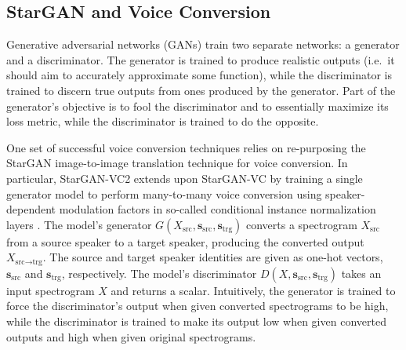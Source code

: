 \subsection{StarGAN and Voice Conversion}
\label{sec:stargan}

Generative adversarial networks (GANs) train two separate networks: a generator and a discriminator.
The generator is trained to produce realistic outputs (i.e.\ it should aim to accurately approximate some function), while the discriminator is trained to discern true outputs from ones produced by the generator.
Part of the generator's objective is to fool the discriminator and to essentially maximize its loss metric, while the discriminator is trained to do the opposite.

One set of successful voice conversion techniques relies on re-purposing the StarGAN image-to-image translation technique \cite{choi2018stargan} for voice conversion.
In particular, StarGAN-VC2 \cite{stargan-vc2} extends upon StarGAN-VC \cite{stargan-vc} by training a single generator model to perform many-to-many voice conversion using speaker-dependent modulation factors in so-called conditional instance normalization layers \cite{CIN}.
The model's
generator $G(X_\text{src}, \mathbf{s}_\text{src}, \mathbf{s}_\text{trg})$ converts a spectrogram $X_{\text{src}}$ from a source speaker to a target speaker, producing the converted output $X_{\text{src}\rightarrow \text{trg}}$.
The source and target speaker identities are given as one-hot vectors,  $\mathbf{s}_\text{src}$ and $\mathbf{s}_\text{trg}$, respectively.
The model's discriminator $D(X, \mathbf{s}_\text{src}, \mathbf{s}_\text{trg})$ takes an input spectrogram $X$ and returns a scalar. 
Intuitively, the generator is trained to force the discriminator's output when given converted spectrograms to be high, while the discriminator is trained to make its output low when given converted outputs and high when given original spectrograms.

